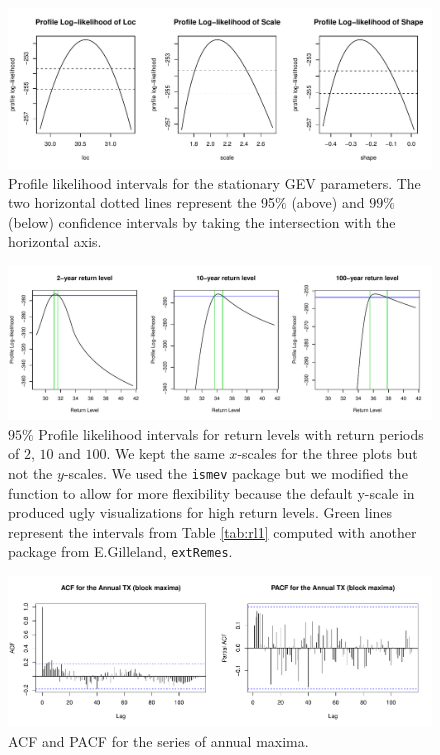 \begin{figure}[!htb]
\centering	\includegraphics[width=.85\linewidth]{proflikpar.pdf}\caption{ Profile likelihood intervals for the stationary GEV parameters. The two horizontal dotted lines represent the 95$\%$ (above) and $99\%$ (below) confidence intervals by taking the intersection with the horizontal axis.}\label{fig:proflikpar}
\end{figure}



\begin{figure}[!htb]
	\centering	\includegraphics[width=.95\linewidth]{proflikrl.pdf}\caption{ $95\%$ Profile likelihood intervals for return levels with return periods of $2$, $10$ and $100$. We kept the same $x$-scales for the three plots but not the $y$-scales. We used the \texttt{ismev} package but we modified the function to allow for more flexibility because the default y-scale in produced ugly visualizations for high return levels. Green lines represent the intervals from Table \ref{tab:rl1} computed with another package from E.Gilleland, \texttt{extRemes}. }\label{fig:proflikrl}
\end{figure}


\begin{figure}[!htb]
	\centering	\includegraphics[width=.95\linewidth]{acf_gev.pdf}\caption{ACF and PACF for the series of annual maxima.}\label{fig:acf_gev}
\end{figure}




